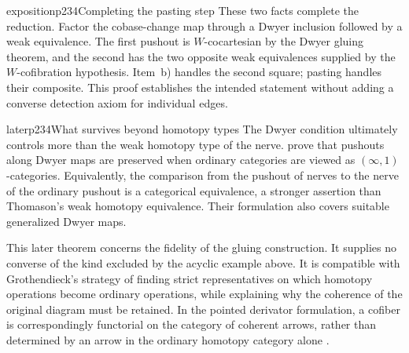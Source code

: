 \begin{dcomment}{exposition}{p234}{Completing the pasting step}
These two facts complete the reduction. Factor the cobase-change map through a Dwyer inclusion followed by a weak equivalence. The first pushout is $W$-cocartesian by the Dwyer gluing theorem, and the second has the two opposite weak equivalences supplied by the $W$-cofibration hypothesis. Item~b) handles the second square; pasting handles their composite. This proof establishes the intended statement without adding a converse detection axiom for individual edges.
\end{dcomment}


\begin{dcomment}{later}{p234}{What survives beyond homotopy types}
The Dwyer condition ultimately controls more than the weak homotopy type of the nerve. \citet[Theorems 1.5 and 1.6; arXiv version 3]{HackneyOzornovaRiehlRovelli2024} prove that pushouts along Dwyer maps are preserved when ordinary categories are viewed as $(\infty,1)$-categories. Equivalently, the comparison from the pushout of nerves to the nerve of the ordinary pushout is a categorical equivalence, a stronger assertion than Thomason's weak homotopy equivalence. Their formulation also covers suitable generalized Dwyer maps.

This later theorem concerns the fidelity of the gluing construction. It supplies no converse of the kind excluded by the acyclic example above. It is compatible with Grothendieck's strategy of finding strict representatives on which homotopy operations become ordinary operations, while explaining why the coherence of the original diagram must be retained. In the pointed derivator formulation, a cofiber is correspondingly functorial on the category of coherent arrows, rather than determined by an arrow in the ordinary homotopy category alone \citep[Definition 3.18]{Groth2013}.
\end{dcomment}
